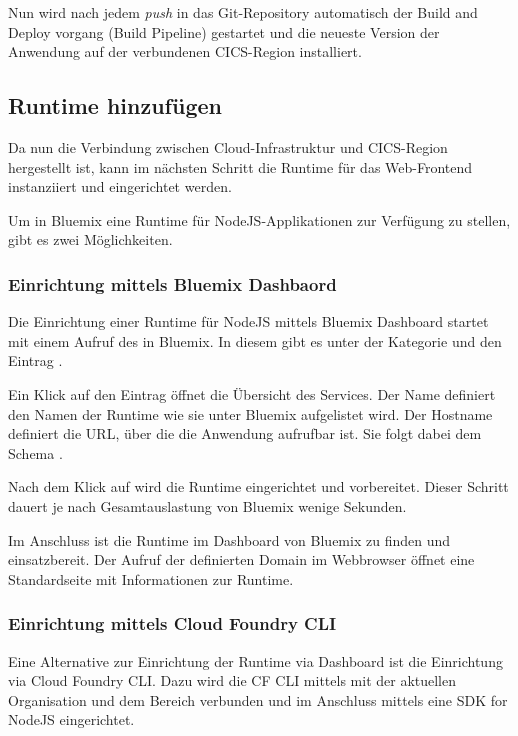 Nun wird nach jedem \textit{push} in das Git-Repository automatisch der Build and Deploy vorgang (Build Pipeline) gestartet
und die neueste Version der Anwendung auf der verbundenen CICS-Region installiert.

\subsection{Runtime hinzufügen}
\label{subsec:runtime_hinzufügen}
Da nun die Verbindung zwischen Cloud-Infrastruktur und CICS-Region hergestellt ist, kann im nächsten Schritt die Runtime
für das Web-Frontend instanziiert und eingerichtet werden.

Um in Bluemix eine Runtime für NodeJS-Applikationen zur Verfügung zu stellen, gibt es zwei Möglichkeiten.

\subsubsection{Einrichtung mittels Bluemix Dashbaord}
\label{subsubsection:bluemixDashbaord}
Die Einrichtung einer Runtime für NodeJS mittels Bluemix Dashboard startet mit einem Aufruf des  in Bluemix.
In diesem gibt es unter der Kategorie  und  den Eintrag .

Ein Klick auf den Eintrag öffnet die Übersicht des Services. Der Name definiert den Namen der Runtime wie sie unter
Bluemix aufgelistet wird. Der Hostname definiert die URL, über die die Anwendung aufrufbar ist. Sie folgt dabei dem Schema
.

Nach dem Klick auf  wird die Runtime eingerichtet und vorbereitet. Dieser Schritt dauert je nach
Gesamtauslastung von Bluemix wenige Sekunden.

Im Anschluss ist die Runtime im Dashboard von Bluemix zu finden und einsatzbereit. Der Aufruf der definierten Domain
im Webbrowser öffnet eine Standardseite mit Informationen zur Runtime.

\subsubsection{Einrichtung mittels Cloud Foundry CLI}
Eine Alternative zur Einrichtung der Runtime via Dashboard ist die Einrichtung via Cloud Foundry CLI. Dazu wird die CF CLI
mittels  mit der aktuellen Organisation und dem Bereich verbunden und im Anschluss mittels 
eine SDK for NodeJS eingerichtet.

